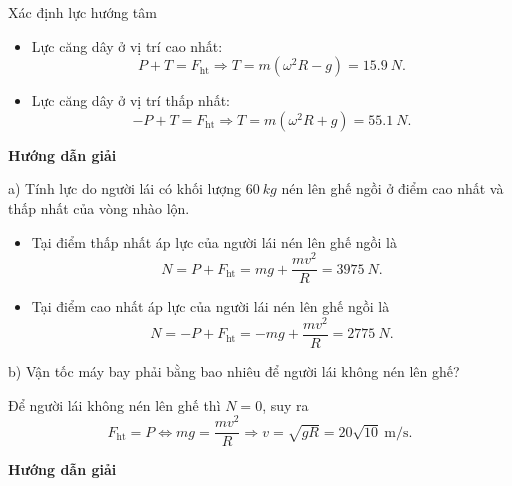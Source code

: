\begin{dang}{Xác định lực hướng tâm}
{		\begin{itemize}
			\item Lực căng dây ở vị trí cao nhất:
			\begin{equation*}
				P+T =F_{\text{ht}} \Rightarrow T = m(\omega^2R -g)=\SI{15,9}{N}.
			\end{equation*}
			\item Lực căng dây ở vị trí thấp nhất: 
			\begin{equation*}
				-P+T =F_{\text{ht}} \Rightarrow T = m(\omega^2R +g)=\SI{55,1}{N}.
			\end{equation*}
		\end{itemize}
	}
	{	\begin{center}
			\textbf{Hướng dẫn giải}
		\end{center}
		
		a) Tính lực do người lái có khối lượng $\SI{60}{kg}$ nén lên ghế ngồi ở điểm cao nhất và thấp nhất của vòng nhào lộn.
		
		\begin{itemize}
			\item Tại điểm thấp nhất áp lực của người lái nén lên ghế ngồi là
			\begin{equation*}
				N=P+F_{\text{ht}} = mg +\dfrac{mv^2}{R} = \SI{3975}{N}.
			\end{equation*} 
			\item Tại điểm cao nhất áp lực của người lái nén lên ghế ngồi là
			\begin{equation*}
				N=-P+F_{\text{ht}} = -mg +\dfrac{mv^2}{R} = \SI{2775}{N}.
			\end{equation*} 
		\end{itemize}
		
		b) Vận tốc máy bay phải bằng bao nhiêu để người lái không nén lên ghế?
		
		Để người lái không nén lên ghế thì $N=0$, suy ra 
		\begin{equation*}
			F_{\text{ht}}=P \Leftrightarrow mg = \dfrac{mv^2}{R} \Rightarrow v =\sqrt {gR} = 20\sqrt {10}\ \text{m/s}.
		\end{equation*}
	}
	{	\begin{center}
			\textbf{Hướng dẫn giải}
		\end{center}
		
}
\end{dang}
